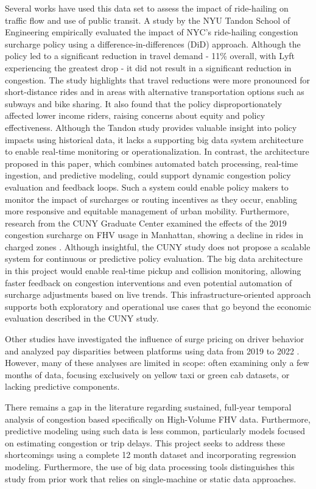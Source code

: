 \documentclass[12pt,letterpaper]{article}
\begin{document}
Several works have used this data set to assess the impact of ride-hailing on traffic flow and use of public transit. A study by the NYU Tandon School of Engineering empirically evaluated the impact of NYC’s ride-hailing congestion surcharge policy using a difference-in-differences (DiD) approach. Although the policy led to a significant reduction in travel demand - 11\% overall, with Lyft experiencing the greatest drop - it did not result in a significant reduction in congestion. The study highlights that travel reductions were more pronounced for short-distance rides and in areas with alternative transportation options such as subways and bike sharing. It also found that the policy disproportionately affected lower income riders, raising concerns about equity and policy effectiveness\cite{nyu2023}. Although the Tandon study provides valuable insight into policy impacts using historical data, it lacks a supporting big data system architecture to enable real-time monitoring or operationalization. In contrast, the architecture proposed in this paper, which combines automated batch processing, real-time ingestion, and predictive modeling, could support dynamic congestion policy evaluation and feedback loops. Such a system could enable policy makers to monitor the impact of surcharges or routing incentives as they occur, enabling more responsive and equitable management of urban mobility. Furthermore, research from the CUNY Graduate Center examined the effects of the 2019 congestion surcharge on FHV usage in Manhattan, showing a decline in rides in charged zones \cite{cuny2023}. Although insightful, the CUNY study does not propose a scalable system for continuous or predictive policy evaluation. The big data architecture in this project would enable real-time pickup and collision monitoring, allowing faster feedback on congestion interventions and even potential automation of surcharge adjustments based on live trends. This infrastructure-oriented approach supports both exploratory and operational use cases that go beyond the economic evaluation described in the CUNY study.

Other studies have investigated the influence of surge pricing on driver behavior \cite{surgepricing2022} and analyzed pay disparities between platforms using data from 2019 to 2022 \cite{ucla2023}. However, many of these analyses are limited in scope: often examining only a few months of data, focusing exclusively on yellow taxi or green cab datasets, or lacking predictive components.

There remains a gap in the literature regarding sustained, full-year temporal analysis of congestion based specifically on High-Volume FHV data. Furthermore, predictive modeling using such data is less common, particularly models focused on estimating congestion or trip delays. This project seeks to address these shortcomings using a complete 12 month dataset and incorporating regression modeling. Furthermore, the use of big data processing tools distinguishes this study from prior work that relies on single-machine or static data approaches.
\end{document}
